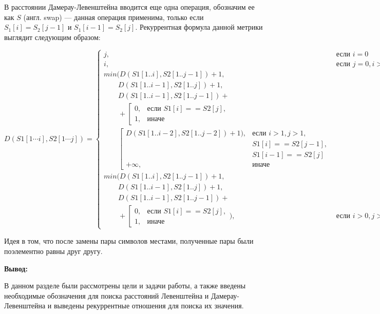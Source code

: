 В расстоянии Дамерау-Левенштейна вводится еще одна операция, обозначим ее как $S$ (англ. swap) --- данная операция применима, только  если $S_{1}[i] = S_{2}[j - 1]$
и $S_{1}[i - 1] = S_{2}[j]$. Рекуррентная формула  данной метрики выглядит следующим образом:
\begin{tiny}
\begin{equation}
	\label{eq:damerau}
	D(S1[1\cdots i],S2[1 \cdots j]) = \left\{ \begin{array}{ll}
		j, & \textrm{$\mbox{если }i = 0$}\\
		i, & \textrm{$\mbox{если }j = 0, i > 1$}\\ 
		min(D(S1[1..i], S2[1.. j - 1]) + 1,\\
		\qquad D(S1[1..i - 1], S2[1..j]) + 1,\\
		\qquad D(S1[1..i - 1], S2[1..j - 1]) + \\
		\qquad+\left[ 
		\begin{array}{ccc}
			0, & \textrm{$\mbox{если }S1[i] == S2[j],$}\\
			1, & \textrm{иначе}
		\end{array} 
		\right.\\
		\qquad \left[
		\begin{array}{ccc}
			D(S1[1..i - 2], S2[1..j - 2]) + 1), & \textrm{$\mbox{если }i > 1, j > 1,$}\\
			& \textrm{$S1[i] == S2[j - 1],$}\\
			& \textrm{$S1[i - 1] == S2[j]$}\\
			+{\infty}, & \textrm{иначе}
		\end{array}
	\right.\\
		
		min(D(S1[1..i], S2[1..j - 1]) + 1,\\
		\qquad D(S1[1..i - 1], S2[1..j]) + 1, \\
		\qquad D(S1[1..i - 1], S2[1..j - 1]) + \\
		\qquad+\left[ 
		\begin{array}{ccc}
			0, & \textrm{$\mbox{если }S1[i] == S2[j],$}\\
			1, & \textrm{иначе}
		\end{array} 
		\right.), &\textrm{$\mbox{если }i>0, j>0$}
	\end{array} \right.
\end{equation}
\end{tiny}
Идея в том, что после замены пары символов местами, полученные пары были поэлементно равны друг другу.

\textbf{Вывод:}

В данном разделе были рассмотрены цели и задачи работы, а также введены необходимые обозначения для поиска расстояний Левенштейна и Дамерау-Левенштейна
и выведены рекуррентные отношения для поиска их значения.

